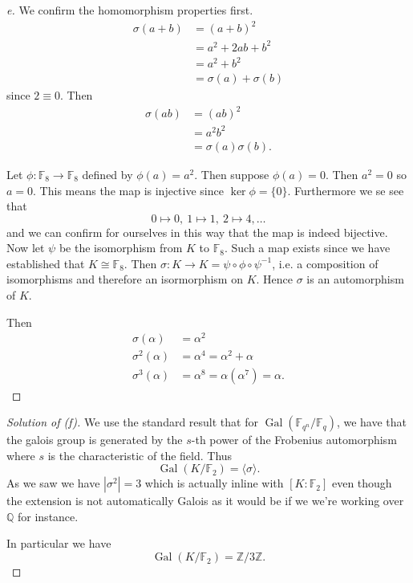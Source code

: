 \begin{proof}[e]
    We confirm the homomorphism properties first. 
    \begin{align*}
        \sigma(a+b) 
        &= (a+b)^2 \\ 
        &= a^2 + 2ab + b^2 \\ 
        &= a^2 + b^2 \\ 
        &= \sigma(a) + \sigma(b)
    \end{align*}
    since $2 \equiv 0$. 
    Then 
    \begin{align*}
        \sigma(ab) 
        &= (ab)^2 \\ 
        &= a^2b^2 \\ 
        &= \sigma(a)\sigma(b).
    \end{align*}

    Let $\phi : \mathbb F_8 \to \mathbb F_8$ defined 
    by $\phi(a) = a^2$. Then suppose 
    $\phi(a) = 0$. Then $a^2 = 0$ so 
    $a = 0$. This means the map is injective since 
    $\ker \phi = \{0\}$. Furthermore we se see that 
    \[
        0 \mapsto 0, \ 1 \mapsto 1, \ 2 \mapsto 4, \ldots
    \] 
    and we can confirm for ourselves in this way that 
    the map is indeed bijective. 
    Now let $\psi$ be the isomorphism from 
    $K$ to $\mathbb F_8$. Such a map exists since 
    we have established that $K \cong \mathbb F_8$. 
    Then $\sigma : K \to K = \psi \circ \phi \circ \psi^{-1}$, i.e. 
    a composition of isomorphisms and therefore an isormorphism 
    on $K$. Hence $\sigma$ is an automorphism of 
    $K$.

    Then 
    \begin{align*}
        \sigma(\alpha) 
        &= \alpha^2 \\ 
        \sigma^2(\alpha ) 
        &= \alpha^4 = \alpha^2 + \alpha \\ 
        \sigma^3(\alpha) &= 
        \alpha^8 = \alpha(\alpha^7) = \alpha. 
    \end{align*}
\end{proof}
\begin{proof}[Solution of (f)]
    We use the standard result that 
    for $\operatorname{Gal}
    (\mathbb F_{q^n}/\mathbb F_q)$, we have 
    that the galois group is generated by the 
    $s$-th power of the 
    Frobenius automorphism where $s$ is the 
    characteristic of the field. 
    Thus 
    \[
        \operatorname{Gal}(K/\mathbb F_2) 
        = \langle \sigma \rangle.
    \]
    As we saw we have 
    $|\sigma^2| = 3$ which is actually 
    inline with $[K : \mathbb F_2]$ even 
    though the extension is not automatically 
    Galois as it would be if we we're working over 
    $\mathbb Q$ for instance.

    In particular we have 
    \[
        \operatorname{Gal}(K/\mathbb F_2) 
        = \mathbb Z/3 \mathbb Z.
    \]
\end{proof}

